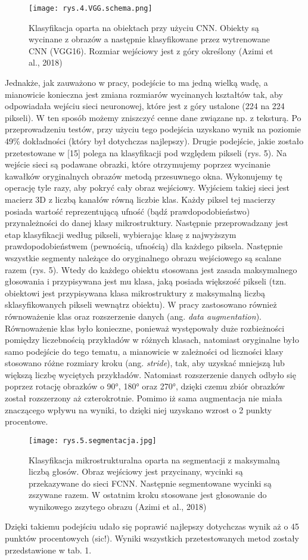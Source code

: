 \begin{figure}[h]
    \centering
    \texttt{[image: rys.4.VGG.schema.png]}
    \caption{Klasyfikacja oparta na obiektach przy użyciu CNN. Obiekty są wycinane z obrazów a następnie klasyfikowane przez wytrenowane CNN (VGG16). Rozmiar wejściowy jest z góry określony (Azimi et al., 2018)}
    \label{fig:mesh4}
\end{figure}

\noindent Jednakże, jak zauważono w pracy, podejście to ma jedną wielką wadę, a mianowicie konieczna jest zmiana rozmiarów wycinanych kształtów tak, aby odpowiadała wejściu sieci neuronowej, które jest z góry ustalone (224 na 224 pikseli). W ten sposób możemy zniszczyć cenne dane związane np. z teksturą. Po przeprowadzeniu testów, przy użyciu tego podejścia uzyskano wynik na poziomie 49\% dokładności (który był dotychczas najlepszy). Drugie podejście, jakie zostało przetestowane w [15] polega na klasyfikacji pod względem pikseli (rys. 5). Na wejście sieci są podawane obrazki, które otrzymujemy poprzez wycinanie kawałków oryginalnych obrazów metodą przesuwnego okna. Wykonujemy tę operację tyle razy, aby pokryć cały obraz wejściowy. Wyjściem takiej sieci jest macierz 3D z liczbą kanałów równą liczbie klas. Każdy piksel tej macierzy posiada wartość reprezentującą ufność (bądź prawdopodobieństwo) przynależności do danej klasy mikrostruktury. Następnie przeprowadzany jest etap klasyfikacji według pikseli, wybierając klasę z najwyższym prawdopodobieństwem (pewnością, ufnością) dla każdego piksela. Następnie wszystkie segmenty należące do oryginalnego obrazu wejściowego są scalane razem (rys. 5). Wtedy do każdego obiektu stosowana jest zasada maksymalnego głosowania i przypisywana jest mu klasa, jaką posiada większość pikseli (tzn. obiektowi jest przypisywana klasa mikrostruktury z maksymalną liczbą sklasyfikowanych pikseli wewnątrz obiektu). W pracy zastosowano również równoważenie klas oraz rozszerzenie danych (ang. \textit{data augmentation}). Równoważenie klas było konieczne, ponieważ występowały duże rozbieżności pomiędzy liczebnością przykładów w różnych klasach, natomiast oryginalne było samo podejście do tego tematu, a mianowicie w zależności od liczności klasy stosowano różne rozmiary kroku (ang. \textit{stride}), tak, aby uzyskać mniejszą lub większą liczbę wyciętych przykładów. Natomiast rozszerzenie danych odbyło się poprzez rotację obrazków o 90°, 180° oraz 270°, dzięki czemu zbiór obrazków został rozszerzony aż czterokrotnie. Pomimo iż sama augmentacja nie miała znaczącego wpływu na wyniki, to dzięki niej uzyskano wzrost o 2 punkty procentowe.
\begin{figure}[h]
    \centering
    \texttt{[image: rys.5.segmentacja.jpg]}
    \caption{Klasyfikacja mikrostrukturalna oparta na segmentacji z maksymalną liczbą głosów. Obraz wejściowy jest przycinany, wycinki są przekazywane do sieci FCNN. Następnie 	segmentowane wycinki są zszywane razem. W ostatnim kroku stosowane jest głosowanie do wynikowego zszytego obrazu (Azimi et al., 2018)}
    \label{fig:mesh5}
\end{figure}
Dzięki takiemu podejściu udało się poprawić najlepszy dotychczas wynik aż o 45 punktów procentowych (sic!). Wyniki wszystkich przetestowanych metod zostały przedstawione w tab. 1.

